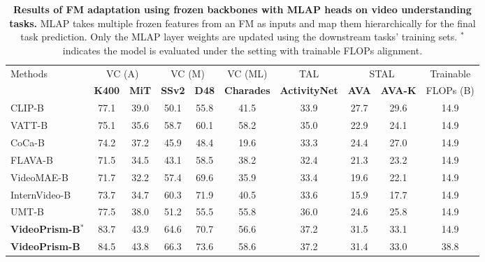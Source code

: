 \documentclass{article}
\theoremstyle{plain}
\theoremstyle{definition}
\theoremstyle{remark}
\newcommand{\OURS}{VideoPrism\xspace}
\begin{document}
\begin{table}
\vskip -0.1in
\end{table} \begin{table}
\caption{
\textbf{Results of FM adaptation using frozen backbones with MLAP heads on video understanding tasks.}
MLAP takes multiple frozen features from an FM as inputs and map them hierarchically
for the final task prediction. Only the MLAP layer weights are updated using the downstream tasks’ training sets.
$^{\ast}$ indicates the model is evaluated under the setting with trainable FLOPs alignment.
}
\label{tbl:videoglue_mlap}
\begin{center}
\begin{scriptsize}
\begin{tabular}{@{}l|cc|cc|c|c|cc|c@{}} 
\toprule
\multirow{2}{*}{Methods} & \multicolumn{2}{c|}{VC (A)} & \multicolumn{2}{c|}{VC (M)} & VC (ML) & TAL & \multicolumn{2}{c|}{STAL} & Trainable \\
& \textbf{K400} & \textbf{MiT} & \textbf{SSv2} & \textbf{D48} & \textbf{Charades} & \textbf{ActivityNet} & \textbf{AVA} & \textbf{AVA-K} & FLOPs (B) \\
\midrule
CLIP-B~\cite{radford2021learning} & 77.1 & 39.0 & 50.1 & 55.8 & 41.5 & 33.9 & 27.7 & 29.6 & 14.9 \\
VATT-B~\cite{akbari2021vatt} & 75.1 & 35.6 & 58.7 & 60.1 & 58.2 & 35.0 & 22.9 & 24.1 & 14.9 \\
CoCa-B~\cite{yu2022coca} & 74.2 & 37.2 & 45.9 & 48.4 & 19.6 & 33.3 & 24.4 & 27.0 & 14.9 \\
FLAVA-B~\cite{singh2022flava} & 71.5 & 34.5 & 43.1 & 58.5 & 38.2 & 32.4 & 21.3 & 23.2 & 14.9 \\
VideoMAE-B~\cite{tong2022videomae} & 71.7 & 32.2 & 57.4 & 69.6 & 35.9 & 33.4 & 19.6 & 22.1 & 14.9 \\
InternVideo-B~\cite{wang2022internvideo} & 73.7 & 34.7 & 60.3 & 71.9 & 40.5 & 33.6 & 15.9 & 17.7 & 14.9 \\
UMT-B~\cite{li2023unmasked} & 77.5 & 38.0 & 51.2 & 55.5 & 55.8 & 36.0 & 24.6 & 25.8 & 14.9 \\
\textbf{\OURS-B}$^{\ast}$ & 83.7 & 43.9 & 64.6 & 70.7 & 56.6 & 37.2 & 31.5 & 33.1 & 14.9 \\
\textbf{\OURS-B} & 84.5 & 43.8 & 66.3 & 73.6 & 58.6 & 37.2 & 31.4 & 33.0 & 38.8 \\
\bottomrule
\end{tabular}
\end{scriptsize}
\end{center}
\vskip -0.1in
\end{table} \begin{table}

\end{table}
\end{document}
